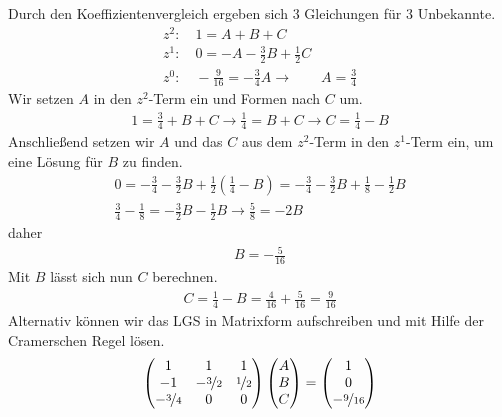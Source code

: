 \documentclass[11pt,a4paper,DIV=12]{scrartcl}
\begin{document}
Durch den Koeffizientenvergleich ergeben sich $3$ Gleichungen für $3$ Unbekannte.
\begin{gather}
	z^2:\quad 1 = A+B+C\\
	z^1:\quad 0 = -A -\frac{3}{2}B + \frac{1}{2}C\\
	z^0:\quad -\frac{9}{16} = -\frac{3}{4}A \rightarrow \qquad A = \frac{3}{4}
\end{gather}
Wir setzen $A$ in den $z^2$-Term ein und Formen nach $C$ um.
\begin{gather}
	1 = \frac{3}{4}+B+C \rightarrow \frac{1}{4} = B + C \rightarrow C = \frac{1}{4} - B
\end{gather}
Anschließend setzen wir $A$ und das $C$ aus dem $z^2$-Term in den $z^1$-Term ein, um eine Lösung für $B$ zu finden.
\begin{gather}
	0 = - \frac{3}{4} -\frac{3}{2}B + \frac{1}{2} (\frac{1}{4} - B) =
	- \frac{3}{4} -\frac{3}{2}B + \frac{1}{8} - \frac{1}{2} B\\
	\frac{3}{4} - \frac{1}{8} =  - \frac{3}{2}B - \frac{1}{2} B \rightarrow
	\frac{5}{8} =  -  2 B
\end{gather}
daher
\begin{gather}
	B = -\frac{5}{16}
\end{gather}
Mit $B$ lässt sich nun $C$ berechnen.
\begin{gather}
	C = \frac{1}{4} - B = \frac{4}{16} + \frac{5}{16} = \frac{9}{16}
\end{gather}
Alternativ können wir das LGS in Matrixform aufschreiben und mit Hilfe der Cramerschen Regel lösen.
\begin{gather}
	\begin{pmatrix}
		1 & 1 & 1 \\
		-1 & -\nicefrac{3}{2} & \nicefrac{1}{2} \\
		-\nicefrac{3}{4} & 0 & 0
	\end{pmatrix}
	\begin{pmatrix}
		A \\
		B \\
		C
	\end{pmatrix}
	=
	\begin{pmatrix}
		1 \\
		0 \\
		-\nicefrac{9}{16}
	\end{pmatrix}
\end{gather}
\end{document}
